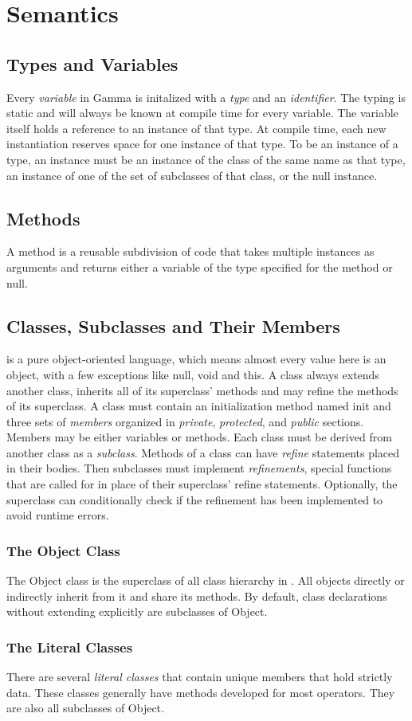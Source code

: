 \section{Semantics}
\subsection{Types and Variables}
Every \textit{variable} in Gamma is initalized with a \textit{type} and an \textit{identifier}. The typing is static and will always be known at compile time for every variable. The variable itself holds a reference to an instance of that type. At compile time, each new instantiation reserves space for one instance of that type. To be an instance of a type, an instance must be an instance of the class of the same name as that type, an instance of one of the set of subclasses of that class, or the null instance.
\subsection{Methods}
A method is a reusable subdivision of code that takes multiple instances as arguments and returns either a variable of the type specified for the method or null.
\subsection{Classes, Subclasses and Their Members}
\Lang{} is a pure object-oriented language, which means almost every value here is an object, with a few exceptions like null, void and this. A class always extends another class, inherits all of its superclass' methods and may refine the methods of its superclass. A class must contain an initialization method named init and three sets of \textit{members} organized in \textit{private}, \textit{protected}, and \textit{public} sections. Members may be either variables or methods. Each class must be derived from another class as a \textit{subclass}. Methods of a class can have \textit{refine} statements placed in their bodies. Then subclasses must implement \textit{refinements}, special functions that are called for in place of their superclass' refine statements. Optionally, the superclass can conditionally check if the refinement has been implemented to avoid runtime errors.
\subsubsection{The Object Class}
The Object class is the superclass of all class hierarchy in \Lang{}. All objects directly or indirectly inherit from it and share its methods. By default, class declarations without extending explicitly are subclasses of Object.
\subsubsection{The Literal Classes}
There are several \textit{literal classes} that contain unique members that hold strictly data. These classes generally have methods developed for most operators. They are also all subclasses of Object.
